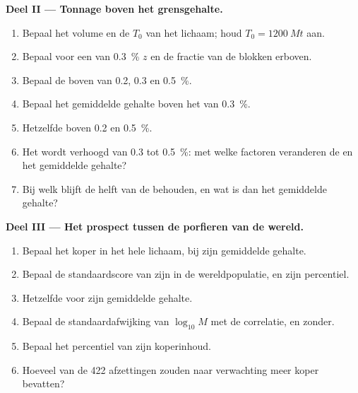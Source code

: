 \begin{problem}
\noindent\textbf{Deel II --- Tonnage boven het grensgehalte.}
\begin{enumerate}[resume]
  \item Bepaal het volume en de  $T_0$ van het lichaam; houd $T_0 = \qty{1200}{Mt}$ aan.
  \item Bepaal voor een  van \qty{0.3}{\percent} $z$ en de fractie van de blokken erboven.
  \item Bepaal de  boven  van 0.2, 0.3 en \qty{0.5}{\percent}.
  \item Bepaal het gemiddelde gehalte boven het  van \qty{0.3}{\percent}.
  \item Hetzelfde boven 0.2 en \qty{0.5}{\percent}.
  \item Het  wordt verhoogd van 0.3 tot \qty{0.5}{\percent}: met welke factoren veranderen de  en het
        gemiddelde gehalte?
  \item Bij welk  blijft de helft van de  behouden, en wat is dan het gemiddelde gehalte?
\end{enumerate}

\noindent\textbf{Deel III --- Het prospect tussen de porfieren van de wereld.}
\begin{enumerate}[resume]
  \item Bepaal het koper in het hele lichaam, bij zijn gemiddelde gehalte.
  \item Bepaal de standaardscore van zijn  in de wereldpopulatie, en zijn percentiel.
  \item Hetzelfde voor zijn gemiddelde gehalte.
  \item Bepaal de standaardafwijking van $\log_{10} M$ met de correlatie, en zonder.
  \item Bepaal het percentiel van zijn koperinhoud.
  \item Hoeveel van de 422 afzettingen zouden naar verwachting meer koper bevatten?
\end{enumerate}


\end{problem}
